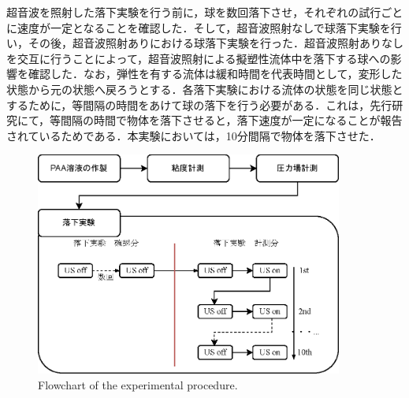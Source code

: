 超音波を照射した落下実験を行う前に，球を数回落下させ，それぞれの試行ごとに速度が一定となることを確認した．そして，超音波照射なしで球落下実験を行い，その後，超音波照射ありにおける球落下実験を行った．超音波照射ありなしを交互に行うことによって，超音波照射による擬塑性流体中を落下する球への影響を確認した．なお，弾性を有する流体は緩和時間を代表時間として，変形した状態から元の状態へ戻ろうとする．各落下実験における流体の状態を同じ状態とするために，等間隔の時間をあけて球の落下を行う必要がある．これは，先行研究\cite{ref:8-5}にて，等間隔の時間で物体を落下させると，落下速度が一定になることが報告されているためである．本実験においては，10分間隔で物体を落下させた．

\begin{figure}[ht]
    \centering
    \includegraphics[width=0.9\textwidth]{2-Methods/exp-methods.eps}
    \caption{Flowchart of the experimental procedure.}
    \label{fig:exp-methods}
\end{figure}
